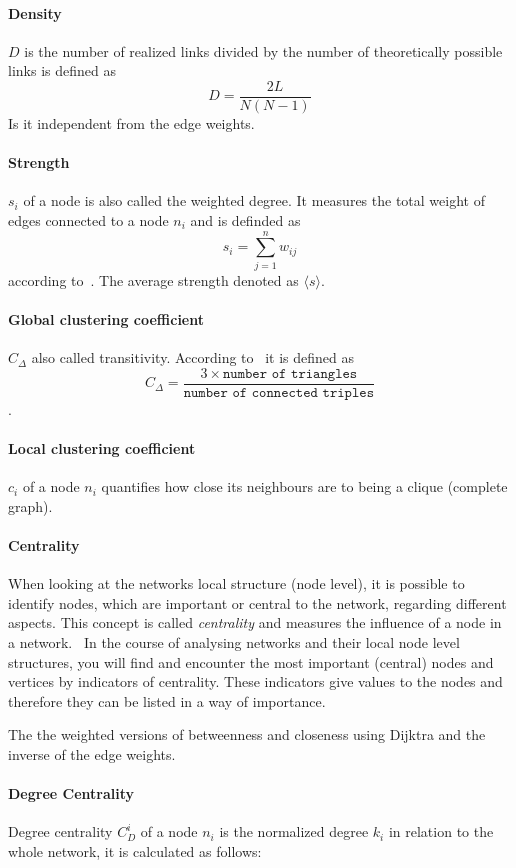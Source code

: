 \paragraph{Density} $D$ is the number of realized links divided by the number
of theoretically possible links is defined as $$D=\frac{2L}{N(N-1)}$$ Is it independent from the edge weights.

\paragraph{Strength} $s_i$ of a node is also called the weighted degree. It measures the total weight of edges connected to a node $n_i$ and is definded as $$s_i = \sum_{j=1}^{n}w_{ij}$$ according to~\textcite{barrat2004architecture}. The average strength denoted as $\langle s \rangle$.

\paragraph{Global clustering coefficient} $C_\Delta$ also called transitivity. According to~\textcite{wasserman1994social} it is defined as $$C_\Delta = \frac{3 \times \texttt{number of triangles}}{\texttt{number of connected triples}}$$.

\paragraph{Local clustering coefficient} $c_i$ of a node $n_i$ quantifies how close its neighbours are to being a clique (complete graph).

\paragraph{Centrality}
When looking at the networks local structure (node level), it is possible to identify nodes, which are important or central to the network, regarding different aspects. This concept is called \emph{centrality} and measures the influence of a node in a network.~\cite{newman2010networks}
In the course of analysing networks and their local node level structures, you will find and encounter the most important (central) nodes and vertices by indicators of centrality. These indicators give values to the nodes and therefore they can be listed in a way of importance.

The the weighted versions of betweenness and closeness using Dijktra and the inverse of the edge weights.

\paragraph{Degree Centrality}
Degree centrality $C^i_D$ of a node $n_i$ is the normalized degree $k_i$ in relation to the whole network, it is calculated as follows:

